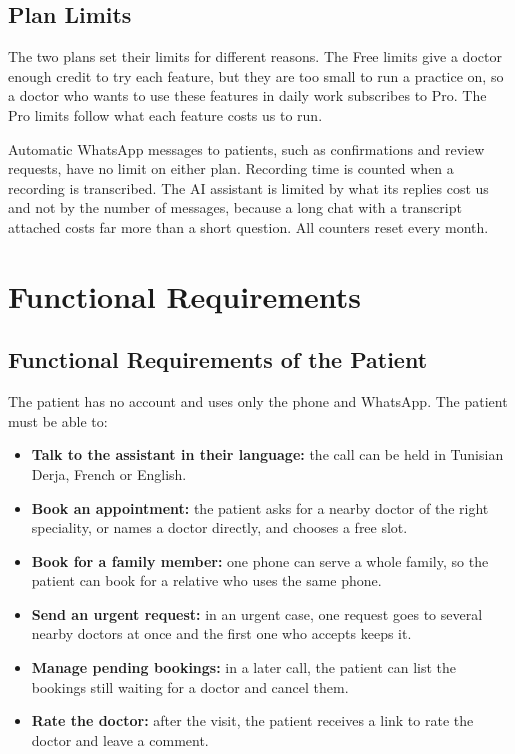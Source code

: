 \subsection{Plan Limits}\label{subsec:usage-limits}

The two plans set their limits for different reasons. The Free limits give a doctor enough credit to try each feature, but they are too small to run a practice on, so a doctor who wants to use these features in daily work subscribes to Pro. The Pro limits follow what each feature costs us to run.

Automatic WhatsApp messages to patients, such as confirmations and review requests, have no limit on either plan. Recording time is counted when a recording is transcribed. The AI assistant is limited by what its replies cost us and not by the number of messages, because a long chat with a transcript attached costs far more than a short question. All counters reset every month.

\section{Functional Requirements}

\subsection{Functional Requirements of the Patient}
The patient has no account and uses only the phone and WhatsApp. The patient must be able to:
\begin{itemize}
    \item \textbf{Talk to the assistant in their language:} the call can be held in Tunisian Derja, French or English.
    \item \textbf{Book an appointment:} the patient asks for a nearby doctor of the right speciality, or names a doctor directly, and chooses a free slot.
    \item \textbf{Book for a family member:} one phone can serve a whole family, so the patient can book for a relative who uses the same phone.
    \item \textbf{Send an urgent request:} in an urgent case, one request goes to several nearby doctors at once and the first one who accepts keeps it.
    \item \textbf{Manage pending bookings:} in a later call, the patient can list the bookings still waiting for a doctor and cancel them.
    \item \textbf{Rate the doctor:} after the visit, the patient receives a link to rate the doctor and leave a comment.
\end{itemize}

